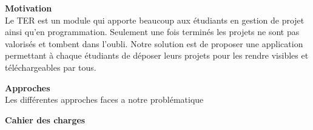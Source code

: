 \documentclass{report}
\begin{document}
\vspace{1cm}
\textbf{\huge{}{Motivation}}\\

Le TER est un module qui apporte beaucoup aux étudiants en gestion de projet ainsi qu'en programmation. Seulement une fois terminés les projets ne sont pas valorisés et tombent dans l'oubli. Notre solution est de proposer une application permettant à chaque étudiants de déposer leurs projets pour les rendre visibles et téléchargeables par tous.

\vspace{1cm}
\textbf{\huge{}{Approches}}\\ %

Les différentes approches faces a notre problématique

\vspace{1cm}
\textbf{\huge{}{Cahier des charges}}\\
\end{document}
